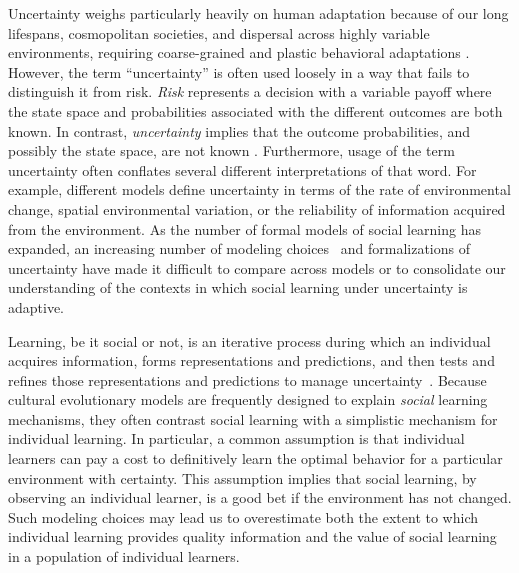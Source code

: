 \documentclass[letterpaper,11.5pt]{scrartcl}
\begin{document}
Uncertainty weighs particularly heavily on human adaptation because of
our long lifespans, cosmopolitan societies, and dispersal across highly variable environments, requiring coarse-grained and plastic behavioral adaptations \citep{levins1962}. However, the term ``uncertainty'' is often used loosely in a way that fails to distinguish it from risk. \emph{Risk} represents a decision with a variable payoff where the state space and probabilities associated with the different outcomes are both known. In contrast, \emph{uncertainty} implies that the outcome probabilities, and possibly the state space, are not known \citep{knight1921, keynes1921}. Furthermore, usage of the term uncertainty often conflates several different interpretations of that word. For example, different models define uncertainty in terms of the rate of environmental change, spatial environmental variation, or the reliability of information acquired from the environment. %
As the number of formal models of social learning has expanded, an increasing number of modeling choices~\citep{Kendal2018} and formalizations of
uncertainty have made it difficult to compare across models or to consolidate our
understanding of the contexts in which social learning under uncertainty is adaptive. 

Learning, be it social or not, is an iterative process during which an individual acquires information, forms representations and predictions, and then tests and refines those representations and predictions to manage uncertainty~\citep{jacobs2011bayesian,clark2013whatever}. Because cultural evolutionary models are frequently designed to explain \emph{social} learning mechanisms, they often contrast social learning with a simplistic mechanism for individual learning. In particular, a common assumption is that individual learners can pay a cost to definitively learn the optimal behavior for a particular environment with certainty. This assumption implies that social learning, by observing an individual learner, is a good bet if the environment has not changed. Such modeling choices may lead us to overestimate both the extent to which individual learning provides quality information and the value of social learning in a population of individual learners. %
\end{document}
